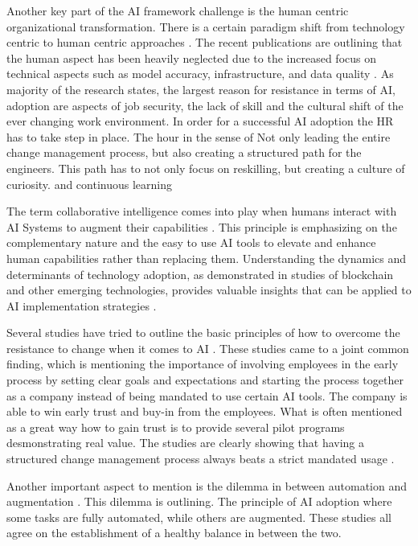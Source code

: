 \documentclass[]{imc-inf}
\begin{document}
Another key part of the AI framework challenge is the human centric organizational transformation. There is a certain paradigm shift from technology centric to human centric approaches \citep{Fenwick2024, Wilson2023, Rinta-Kahila2022}. The recent publications are outlining that the human aspect has been heavily neglected due to the increased focus on technical aspects such as model accuracy, infrastructure, and data quality \citep{Fenwick2024, Wilson2023, Rinta-Kahila2022}. As majority of the research states, the largest reason for resistance in terms of AI, adoption are aspects of job security, the lack of skill and the cultural shift of the ever changing work environment. In order for a successful AI adoption the HR has to take step in place. The hour in the sense of Not only leading the entire change management process, but also creating a structured path for the engineers. This path has to not only focus on reskilling, but creating a culture of curiosity. and continuous learning 

The term collaborative intelligence comes into play when humans interact with AI Systems to augment their capabilities \citep{Wilson2023}. This principle is emphasizing on the complementary nature and the easy to use AI tools to elevate and enhance human capabilities rather than replacing them. Understanding the dynamics and determinants of technology adoption, as demonstrated in studies of blockchain and other emerging technologies, provides valuable insights that can be applied to AI implementation strategies \citep{Fosso2021}.

Several studies have tried to outline the basic principles of how to overcome the resistance to change when it comes to AI \citep{Rinta-Kahila2022, Chowdhury2022, Jarrahi2023}.
These studies came to a joint common finding, which is mentioning the importance of involving employees in the early process by setting clear goals and expectations and starting the process together as a company instead of being mandated to use certain AI tools. The company is able to win early trust and buy-in from the employees. 
What is often mentioned as a great way how to gain trust is to provide several pilot programs desmonstrating real value.
The studies are clearly showing that having a structured change management process always beats a strict mandated usage \citep{Rinta-Kahila2022, Chowdhury2022, Jarrahi2023}. 

Another important aspect to mention is the dilemma in between automation and augmentation \citep{Raisch2021, Brynjolfsson2023, Davenport2019}. This dilemma is outlining. The principle of AI adoption where some tasks are fully automated, while others are augmented. These studies all agree on the establishment of a healthy balance in between the two. 
\end{document}
